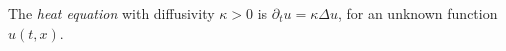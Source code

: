 
The \emph{heat equation} with diffusivity $\kappa>0$ is $\partial_tu=\kappa\Delta u$, for an unknown function $u(t,x)$.
